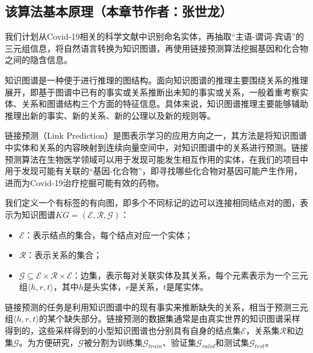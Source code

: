 \documentclass[twocolumn]{article}
\begin{document}
\subsection{该算法基本原理（本章节作者：张世龙）}
我们计划从Covid-19相关的科学文献中识别命名实体，再抽取“主语-谓词-宾语”的三元组信息，将自然语言转换为知识图谱，再使用链接预测算法挖掘基因和化合物之间的隐含信息。\par
知识图谱是一种便于进行推理的图结构。面向知识图谱的推理主要围绕关系的推理展开，即基于图谱中已有的事实或关系推断出未知的事实或关系，一般着重考察实体、关系和图谱结构三个方面的特征信息。具体来说，知识图谱推理主要能够辅助推理出新的事实、新的关系、新的公理以及新的规则等。\par
链接预测（Link Prediction）是图表示学习的应用方向之一，其方法是将知识图谱中实体和关系的内容映射到连续向量空间中，对知识图谱中的关系进行预测。链接预测算法在生物医学领域可以用于发现可能发生相互作用的实体，在我们的项目中用于发现可能有关联的“基因-化合物”，即寻找哪些化合物对基因可能产生作用，进而为Covid-19治疗挖掘可能有效的药物。\par
我们定义一个有标签的有向图，即多个不同标记的边可以连接相同结点对的图，表示为知识图谱$KG=(\mathcal{E}, \mathcal{R}, \mathcal{G})$\cite{link_prediction}：
\begin{itemize}
	\item $\mathcal{E}$：表示结点的集合，每个结点对应一个实体；
	\item $\mathcal{R}$：表示关系的集合；
	\item $\mathcal{G} \subseteq \mathcal{E} \times \mathcal{R} \times \mathcal{E}$：边集，表示每对关联实体及其关系，每个元素表示为一个三元组$\langle h, r, t\rangle$，其中$h$是头实体，$r$是关系，$t$是尾实体。
\end{itemize}\par
链接预测的任务是利用知识图谱中的现有事实来推断缺失的关系，相当于预测三元组$\langle h, r, t\rangle$的某个缺失部分。链接预测的数据集通常是由真实世界的知识图谱采样得到的，这些采样得到的小型知识图谱也分别具有自身的结点集$\mathcal{E}$，关系集$\mathcal{R}$和边集$\mathcal{G}$。为方便研究，$\mathcal{G}$被分割为训练集$\mathcal{G}_{train}$、验证集$\mathcal{G}_{valid}$和测试集$\mathcal{G}_{test}$。\par
\end{document}
